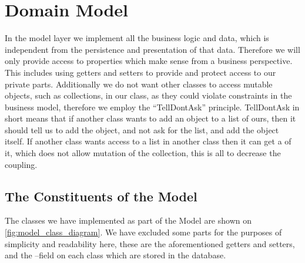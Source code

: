 \chapter{Domain Model}\label{subsec:model}

In the model layer we implement all the business logic and data, which is independent from the persistence and presentation of that data. 
Therefore we will only provide access to properties which make sense from a business perspective.
This includes using getters and setters to provide and protect access to our private parts. %
Additionally we do not want other classes to access mutable objects, such as collections, in our class, as they could violate constraints in the business model, therefore we employ the ``TellDontAsk'' principle\cite{Fowler_TellDontAsk}.
TellDontAsk in short means that if another class wants to add an object to a list of ours, then it should tell us to add the object, and not ask for the list, and add the object itself. 
If another class wants access to a list in another class then it can get a  of it, which does not allow mutation of the collection, this is all to decrease the coupling.

\section{The Constituents of the Model}
The classes we have implemented as part of the Model are shown on \cref{fig:model_class_diagram}.
We have excluded some parts for the purposes of simplicity and readability here, these are the aforementioned getters and setters, and the --field on each class which are stored in the database. 

